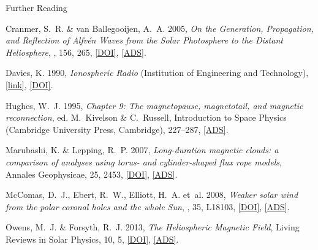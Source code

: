 \documentclass[11pt,aspectratio=1610]{beamer}	%
\begin{document}
\begin{frame}[allowframebreaks]{Further Reading}
	\begin{thebibliography}{10}
	
		\beamertemplatebookbibitems
		
		\beamertemplatearticlebibitems
		
			{Cranmer}, S.~R. \& {van Ballegooijen}, A.~A. 2005, \emph{{On the Generation,
			Propagation, and Reflection of Alfv{\'e}n Waves from the Solar Photosphere to
			the Distant Heliosphere}}, \apjs, 156, 265,
			\href{http://dx.doi.org/10.1086/426507}{[DOI]},
			\href{http://adsabs.harvard.edu/abs/2005ApJS..156..265C}{[ADS]}.
		
			Davies, K. 1990, \emph{Ionospheric Radio} (Institution of Engineering and
			Technology),
			\href{http://digital-library.theiet.org/content/books/ew/pbew031e}{[link]},
			\href{http://dx.doi.org/10.1049/PBEW031E}{[DOI]}.
		
			{Hughes}, W.~J. 1995, \emph{{Chapter 9: The magnetopause, magnetotail, and
			magnetic reconnection}}, ed. M.~Kivelson \& C.~Russell, Introduction to Space
			Physics (Cambridge University Press, Cambridge), 227--287,
			\href{http://adsabs.harvard.edu/abs/1995isp..book.....K}{[ADS]}.
		
			{Marubashi}, K. \& {Lepping}, R.~P. 2007, \emph{{Long-duration magnetic clouds:
			a comparison of analyses using torus- and cylinder-shaped flux rope models}},
			Annales Geophysicae, 25, 2453,
			\href{http://dx.doi.org/10.5194/angeo-25-2453-2007}{[DOI]},
			\href{http://adsabs.harvard.edu/abs/2007AnGeo..25.2453M}{[ADS]}.
			
			{McComas}, D.~J., {Ebert}, R.~W., {Elliott}, H.~A. {et~al.} 2008{},
			\emph{{Weaker solar wind from the polar coronal holes and the whole Sun}},
			\grl, 35, L18103, \href{http://dx.doi.org/10.1029/2008GL034896}{[DOI]},
			\href{http://adsabs.harvard.edu/abs/2008GeoRL..3518103M}{[ADS]}.
		
			{Owens}, M.~J. \& {Forsyth}, R.~J. 2013, \emph{{The Heliospheric Magnetic
			Field}}, Living Reviews in Solar Physics, 10, 5,
			\href{http://dx.doi.org/10.12942/lrsp-2013-5}{[DOI]},
			\href{http://adsabs.harvard.edu/abs/2013LRSP...10....5O}{[ADS]}.
		

\end{thebibliography}
\end{frame}
\end{document}
